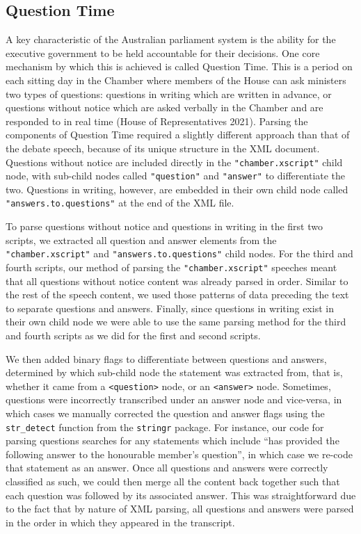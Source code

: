 \documentclass[
  letterpaper,
  DIV=11,
  numbers=noendperiod]{scrartcl}
\begin{document}
\hypertarget{sec-qa}{%
\subsection{Question Time}\label{sec-qa}}

A key characteristic of the Australian parliament system is the ability
for the executive government to be held accountable for their decisions.
One core mechanism by which this is achieved is called Question Time.
This is a period on each sitting day in the Chamber where members of the
House can ask ministers two types of questions: questions in writing
which are written in advance, or questions without notice which are
asked verbally in the Chamber and are responded to in real time (House
of Representatives 2021). Parsing the components of Question Time
required a slightly different approach than that of the debate speech,
because of its unique structure in the XML document. Questions without
notice are included directly in the \texttt{"chamber.xscript"} child
node, with sub-child nodes called \texttt{"question"} and
\texttt{"answer"} to differentiate the two. Questions in writing,
however, are embedded in their own child node called
\texttt{"answers.to.questions"} at the end of the XML file.

To parse questions without notice and questions in writing in the first
two scripts, we extracted all question and answer elements from the
\texttt{"chamber.xscript"} and \texttt{"answers.to.questions"} child
nodes. For the third and fourth scripts, our method of parsing the
\texttt{"chamber.xscript"} speeches meant that all questions without
notice content was already parsed in order. Similar to the rest of the
speech content, we used those patterns of data preceding the text to
separate questions and answers. Finally, since questions in writing
exist in their own child node we were able to use the same parsing
method for the third and fourth scripts as we did for the first and
second scripts.

We then added binary flags to differentiate between questions and
answers, determined by which sub-child node the statement was extracted
from, that is, whether it came from a
\texttt{\textless{}question\textgreater{}} node, or an
\texttt{\textless{}answer\textgreater{}} node. Sometimes, questions were
incorrectly transcribed under an answer node and vice-versa, in which
cases we manually corrected the question and answer flags using the
\texttt{str\_detect} function from the \texttt{stringr} package. For
instance, our code for parsing questions searches for any statements
which include ``has provided the following answer to the honourable
member's question'', in which case we re-code that statement as an
answer. Once all questions and answers were correctly classified as
such, we could then merge all the content back together such that each
question was followed by its associated answer. This was straightforward
due to the fact that by nature of XML parsing, all questions and answers
were parsed in the order in which they appeared in the transcript.
\end{document}
